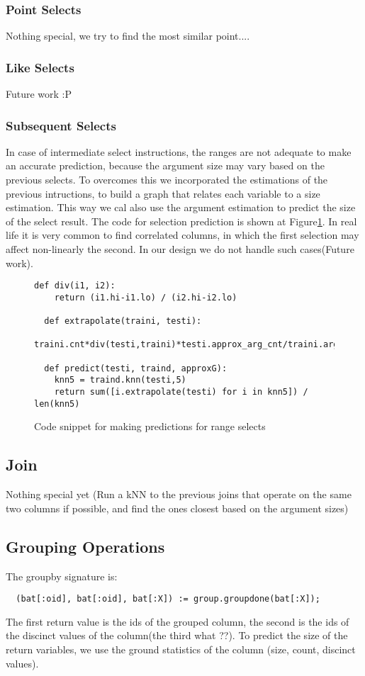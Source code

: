 \subsubsection{Point Selects}
Nothing special, we try to find the most similar point....

\subsubsection{Like Selects}
Future work :P

\subsubsection{Subsequent Selects}
In case of intermediate select instructions, the ranges are not adequate to
make an accurate prediction, because the argument size may vary based on the
previous selects. To overcomes this we incorporated the estimations of the
previous intructions, to build a graph that relates each variable to a size
estimation. This way we cal also use the argument estimation to predict the
size of the select result. The code for selection prediction is shown at
Figure\ref{sel:code}. In real life it is very common to find correlated columns,
in which the first selection may affect non-linearly the second.
In our design we do not handle such cases(Future work).

\begin{figure}[t]
\begin{lstlisting}[frame=single]
  def div(i1, i2):
    return (i1.hi-i1.lo) / (i2.hi-i2.lo)

  def extrapolate(traini, testi):
      traini.cnt*div(testi,traini)*testi.approx_arg_cnt/traini.argcnt

  def predict(testi, traind, approxG):
    knn5 = traind.knn(testi,5)
    return sum([i.extrapolate(testi) for i in knn5]) / len(knn5)
\end{lstlisting}
  \caption{Code snippet for making predictions for range selects}
  \label{sel:code}
\end{figure}


\subsection{Join}
Nothing special yet
(Run a kNN to the previous joins that operate on the same two columns if possible,
and find the ones closest based on the argument sizes)

\subsection{Grouping Operations}
The groupby signature is:
\begin{verbatim}
  (bat[:oid], bat[:oid], bat[:X]) := group.groupdone(bat[:X]);
\end{verbatim}
The first return value is the ids of the grouped column, the second is
the ids of the discinct values of the column(the third what ??). To predict
the size of the return variables, we use the ground statistics of the column
(size, count, discinct values).


